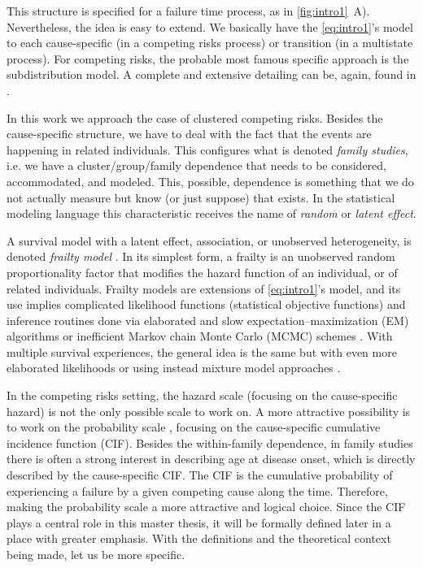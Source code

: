 This structure is specified for a failure time process, as in
\autoref{fig:intro1}~A). Nevertheless, the idea is easy to extend. We
basically have the \autoref{eq:intro1}'s model to each cause-specific
(in a competing risks process) or transition (in a multistate process).
For competing risks, the probable most famous specific approach is
the  subdistribution model. A complete and
extensive detailing can be, again, found in .

In this work we approach the case of clustered competing risks. Besides
the cause-specific structure, we have to deal with the fact that the
events are happening in related individuals. This configures what is
denoted \textit{family studies}, i.e. we have a cluster/group/family
dependence that needs to be considered, accommodated, and modeled. This,
possible, dependence is something that we do not actually measure but
know (or just suppose) that exists. In the statistical modeling language
this characteristic receives the name of \textit{random} or
\textit{latent effect}.

A survival model with a latent effect, association, or unobserved
heterogeneity, is denoted \textit{frailty model}
\cite{frailty78,frailty79,liang95,petersen98}. In its simplest form, a
frailty is an unobserved random proportionality factor that modifies the
hazard function of an individual, or of related individuals. Frailty
models are extensions of \autoref{eq:intro1}'s model, and its use
implies complicated likelihood functions (statistical objective
functions) and inference routines done via elaborated and slow
expectation–maximization (EM) algorithms \cite{nielsen92,klein92} or
inefficient Markov chain Monte Carlo (MCMC) schemes \cite{hougaard00}.
With multiple survival experiences, the general idea is the same but
with even more elaborated likelihoods \cite{prentice78,therneau00} or
using instead mixture model approaches \cite{larson85,kuk92}.

In the competing risks setting, the hazard scale (focusing on the
cause-specific hazard) is not the only possible scale to work on. A more
attractive possibility is to work on the probability scale
\cite{andersen12}, focusing on the cause-specific cumulative incidence
function (CIF). Besides the within-family dependence, in family studies
there is often a strong interest in describing age at disease onset,
which is directly described by the cause-specific CIF. The CIF is the
cumulative probability of experiencing a failure by a given competing
cause along the time. Therefore, making the probability scale a more
attractive and logical choice. Since the CIF plays a central role in
this master thesis, it will be formally defined later in a place with
greater emphasis. With the definitions and the theoretical context being
made, let us be more specific.

